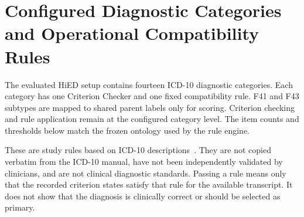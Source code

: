 \documentclass[12pt,a4paper,oneside]{report}
\begin{document}
\chapter{Configured Diagnostic Categories and Operational Compatibility Rules}
\label{app:configured-profile}

The evaluated HiED setup contains fourteen ICD-10 diagnostic categories. Each category has one Criterion Checker and one fixed compatibility rule. F41 and F43 subtypes are mapped to shared parent labels only for scoring. Criterion checking and rule application remain at the configured category level. The item counts and thresholds below match the frozen ontology used by the rule engine.

These are study rules based on ICD-10 descriptions~\citep{who2019icd10}. They are not copied verbatim from the ICD-10 manual, have not been independently validated by clinicians, and are not clinical diagnostic standards. Passing a rule means only that the recorded criterion states satisfy that rule for the available transcript. It does not show that the diagnosis is clinically correct or should be selected as primary.
\end{document}

